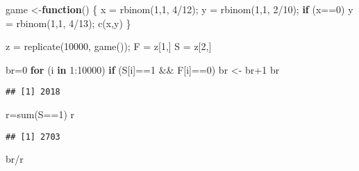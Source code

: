 \documentclass[
]{article}
\newenvironment{Shaded}{\begin{snugshade}}{\end{snugshade}}
\newcommand{\ControlFlowTok}[1]{\textcolor[rgb]{0.13,0.29,0.53}{\textbf{#1}}}
\newcommand{\DecValTok}[1]{\textcolor[rgb]{0.00,0.00,0.81}{#1}}
\newcommand{\FunctionTok}[1]{\textcolor[rgb]{0.00,0.00,0.00}{#1}}
\newcommand{\NormalTok}[1]{#1}
\newcommand{\OtherTok}[1]{\textcolor[rgb]{0.56,0.35,0.01}{#1}}
\newcommand{\SpecialCharTok}[1]{\textcolor[rgb]{0.00,0.00,0.00}{#1}}
\theoremstyle{definition}
\theoremstyle{definition}
\theoremstyle{definition}
\theoremstyle{remark}
\begin{document}
\begin{Shaded}
\begin{Highlighting}[]
\NormalTok{game }\OtherTok{\textless{}{-}}\ControlFlowTok{function}\NormalTok{() \{}
\NormalTok{x }\OtherTok{=} \FunctionTok{rbinom}\NormalTok{(}\DecValTok{1}\NormalTok{,}\DecValTok{1}\NormalTok{, }\DecValTok{4}\SpecialCharTok{/}\DecValTok{12}\NormalTok{);}
\NormalTok{y }\OtherTok{=} \FunctionTok{rbinom}\NormalTok{(}\DecValTok{1}\NormalTok{,}\DecValTok{1}\NormalTok{, }\DecValTok{2}\SpecialCharTok{/}\DecValTok{10}\NormalTok{);}
\ControlFlowTok{if}\NormalTok{ (x}\SpecialCharTok{==}\DecValTok{0}\NormalTok{)}
\NormalTok{y }\OtherTok{=} \FunctionTok{rbinom}\NormalTok{(}\DecValTok{1}\NormalTok{,}\DecValTok{1}\NormalTok{, }\DecValTok{4}\SpecialCharTok{/}\DecValTok{13}\NormalTok{);}
\FunctionTok{c}\NormalTok{(x,y)}
\NormalTok{\}}

\NormalTok{z }\OtherTok{=} \FunctionTok{replicate}\NormalTok{(}\DecValTok{10000}\NormalTok{, }\FunctionTok{game}\NormalTok{());}
\NormalTok{F }\OtherTok{=}\NormalTok{ z[}\DecValTok{1}\NormalTok{,]}
\NormalTok{S }\OtherTok{=}\NormalTok{ z[}\DecValTok{2}\NormalTok{,]}

\NormalTok{br}\OtherTok{=}\DecValTok{0}
\ControlFlowTok{for}\NormalTok{ (i }\ControlFlowTok{in} \DecValTok{1}\SpecialCharTok{:}\DecValTok{10000}\NormalTok{)}
\ControlFlowTok{if}\NormalTok{ (S[i]}\SpecialCharTok{==}\DecValTok{1} \SpecialCharTok{\&\&}\NormalTok{ F[i]}\SpecialCharTok{==}\DecValTok{0}\NormalTok{)}
\NormalTok{br }\OtherTok{\textless{}{-}}\NormalTok{ br}\SpecialCharTok{+}\DecValTok{1}
\NormalTok{br}
\end{Highlighting}
\end{Shaded}

\begin{verbatim}
## [1] 2018
\end{verbatim}

\begin{Shaded}
\begin{Highlighting}[]
\NormalTok{r}\OtherTok{=}\FunctionTok{sum}\NormalTok{(S}\SpecialCharTok{==}\DecValTok{1}\NormalTok{)}
\NormalTok{r}
\end{Highlighting}
\end{Shaded}

\begin{verbatim}
## [1] 2703
\end{verbatim}

\begin{Shaded}
\begin{Highlighting}[]
\NormalTok{br}\SpecialCharTok{/}\NormalTok{r}
\end{Highlighting}
\end{Shaded}
\end{document}
